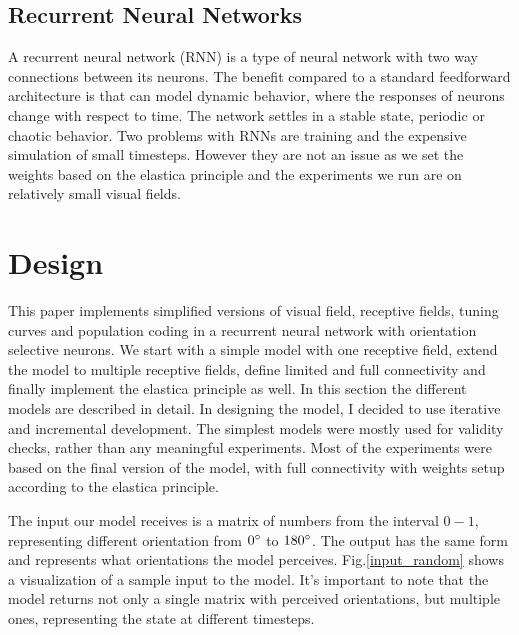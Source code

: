 \section{Recurrent Neural Networks}

A recurrent neural network (RNN) is a type of neural network with two way connections between its neurons. The benefit compared to a standard feedforward architecture is that can model dynamic behavior, where the responses of neurons change with respect to time. The network settles in a stable state, periodic or chaotic behavior. Two problems with RNNs are training and the expensive simulation of small timesteps. However they are not an issue as we set the weights based on the elastica principle and the experiments we run are on relatively small visual fields.

\chapter{Design}

This paper implements simplified versions of visual field, receptive fields, tuning curves and population coding in a recurrent neural network with orientation selective neurons. We start with a simple model with one receptive field, extend the model to multiple receptive fields, define limited and full connectivity and finally implement the elastica principle as well. In this section the different models are described in detail. In designing the model, I decided to use iterative and incremental development. The simplest models were mostly used for validity checks, rather than any meaningful experiments. Most of the experiments were based on the final version of the model, with full connectivity with weights setup according to the elastica principle.  

The input our model receives is a matrix of numbers from the interval $0-1$, representing different orientation from $0\degree$ to $180\degree$. The output has the same form and represents what orientations the model perceives. Fig.\ref{input_random} shows a visualization of a sample input to the model. It's important to note that the model returns not only a single matrix with perceived orientations, but multiple ones, representing the state at different timesteps.



